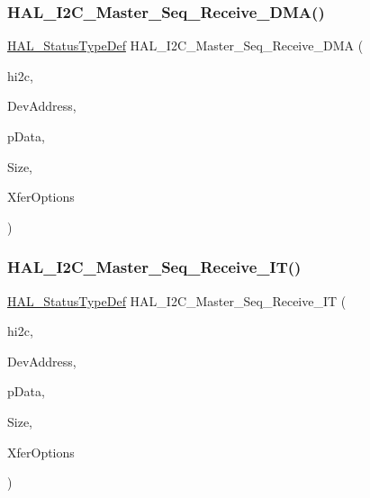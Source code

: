 \subsubsection{\texorpdfstring{H\+A\+L\+\_\+\+I2\+C\+\_\+\+Master\+\_\+\+Seq\+\_\+\+Receive\+\_\+\+D\+M\+A()}{HAL\_I2C\_Master\_Seq\_Receive\_DMA()}}
{\footnotesize\ttfamily \hyperlink{stm32f4xx__hal__def_8h_a63c0679d1cb8b8c684fbb0632743478f}{H\+A\+L\+\_\+\+Status\+Type\+Def} H\+A\+L\+\_\+\+I2\+C\+\_\+\+Master\+\_\+\+Seq\+\_\+\+Receive\+\_\+\+D\+MA (\begin{DoxyParamCaption}\item[{\hyperlink{group___i2_c__handle___structure__definition_ga68e9f45c2fd2161fb827ccdeabb55ea5}{I2\+C\+\_\+\+Handle\+Type\+Def} $\ast$}]{hi2c,  }\item[{uint16\+\_\+t}]{Dev\+Address,  }\item[{uint8\+\_\+t $\ast$}]{p\+Data,  }\item[{uint16\+\_\+t}]{Size,  }\item[{uint32\+\_\+t}]{Xfer\+Options }\end{DoxyParamCaption})}

\mbox{\label{group___i2_c___exported___functions___group2_ga0caa34de50971b2bd5b953ee12af94f1}} 
\subsubsection{\texorpdfstring{H\+A\+L\+\_\+\+I2\+C\+\_\+\+Master\+\_\+\+Seq\+\_\+\+Receive\+\_\+\+I\+T()}{HAL\_I2C\_Master\_Seq\_Receive\_IT()}}
{\footnotesize\ttfamily \hyperlink{stm32f4xx__hal__def_8h_a63c0679d1cb8b8c684fbb0632743478f}{H\+A\+L\+\_\+\+Status\+Type\+Def} H\+A\+L\+\_\+\+I2\+C\+\_\+\+Master\+\_\+\+Seq\+\_\+\+Receive\+\_\+\+IT (\begin{DoxyParamCaption}\item[{\hyperlink{group___i2_c__handle___structure__definition_ga68e9f45c2fd2161fb827ccdeabb55ea5}{I2\+C\+\_\+\+Handle\+Type\+Def} $\ast$}]{hi2c,  }\item[{uint16\+\_\+t}]{Dev\+Address,  }\item[{uint8\+\_\+t $\ast$}]{p\+Data,  }\item[{uint16\+\_\+t}]{Size,  }\item[{uint32\+\_\+t}]{Xfer\+Options }\end{DoxyParamCaption})}

